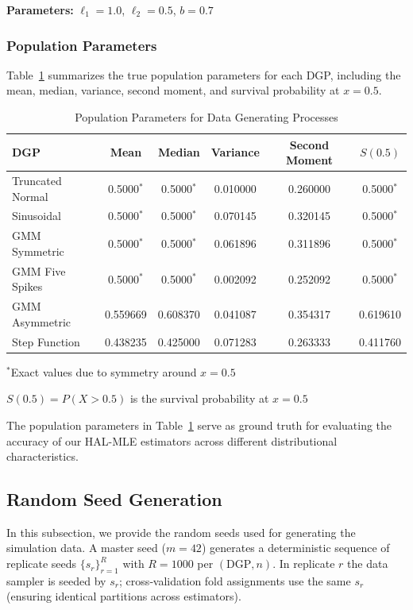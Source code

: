 \textbf{Parameters:} $\ell_1 = 1.0$, $\ell_2 = 0.5$, $b = 0.7$

\subsubsection{Population Parameters}

Table~\ref{tab:dgp_population_params} summarizes the true population parameters for each DGP, including the mean, median, variance, second moment, and survival probability at $x = 0.5$.

\begin{table}[htbp]
\centering
\caption{Population Parameters for Data Generating Processes}
\label{tab:dgp_population_params}
\begin{threeparttable}
\begin{tabular}{lccccc}
\toprule
DGP & Mean & Median & Variance & Second Moment & $S(0.5)$ \\
\midrule
Truncated Normal & 0.5000$^*$ & 0.5000$^*$ & 0.010000 & 0.260000 & 0.5000$^*$ \\
Sinusoidal & 0.5000$^*$ & 0.5000$^*$ & 0.070145 & 0.320145 & 0.5000$^*$ \\
GMM Symmetric & 0.5000$^*$ & 0.5000$^*$ & 0.061896 & 0.311896 & 0.5000$^*$ \\
GMM Five Spikes & 0.5000$^*$ & 0.5000$^*$ & 0.002092 & 0.252092 & 0.5000$^*$ \\
GMM Asymmetric & 0.559669 & 0.608370 & 0.041087 & 0.354317 & 0.619610 \\
Step Function & 0.438235 & 0.425000 & 0.071283 & 0.263333 & 0.411760 \\
\bottomrule
\end{tabular}
\begin{tablenotes}
\small
\item $^*$Exact values due to symmetry around $x = 0.5$
\item $S(0.5) = P(X > 0.5)$ is the survival probability at $x = 0.5$
\end{tablenotes}
\end{threeparttable}
\end{table}

The population parameters in Table~\ref{tab:dgp_population_params} serve as ground truth for evaluating the accuracy of our HAL-MLE estimators across different distributional characteristics. 

\subsection{Random Seed Generation} \label{app_g_2:random_seed}
In this subsection, we provide the random seeds used for generating the simulation data. A master seed ($m=42$) generates a deterministic sequence of replicate seeds $\{s_r\}_{r=1}^R$ with $R=1000$ per $(\text{DGP}, n)$. In replicate $r$ the data sampler is seeded by $s_r$; cross‑validation fold assignments use the same $s_r$ (ensuring identical partitions across estimators).

